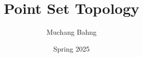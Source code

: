 \documentclass{article}
\begin{document}
\title{Point Set Topology}
\author{Muchang Bahng}
\date{Spring 2025}

\maketitle
\tableofcontents
\pagebreak


 









\end{document}
